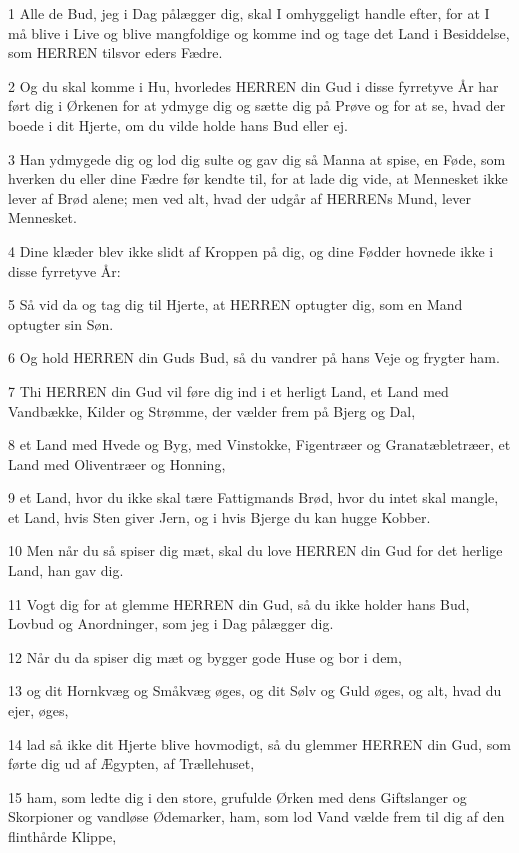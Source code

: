 \par 1 Alle de Bud, jeg i Dag pålægger dig, skal I omhyggeligt handle efter, for at I må blive i Live og blive mangfoldige og komme ind og tage det Land i Besiddelse, som HERREN tilsvor eders Fædre.
\par 2 Og du skal komme i Hu, hvorledes HERREN din Gud i disse fyrretyve År har ført dig i Ørkenen for at ydmyge dig og sætte dig på Prøve og for at se, hvad der boede i dit Hjerte, om du vilde holde hans Bud eller ej.
\par 3 Han ydmygede dig og lod dig sulte og gav dig så Manna at spise, en Føde, som hverken du eller dine Fædre før kendte til, for at lade dig vide, at Mennesket ikke lever af Brød alene; men ved alt, hvad der udgår af HERRENs Mund, lever Mennesket.
\par 4 Dine klæder blev ikke slidt af Kroppen på dig, og dine Fødder hovnede ikke i disse fyrretyve År:
\par 5 Så vid da og tag dig til Hjerte, at HERREN optugter dig, som en Mand optugter sin Søn.
\par 6 Og hold HERREN din Guds Bud, så du vandrer på hans Veje og frygter ham.
\par 7 Thi HERREN din Gud vil føre dig ind i et herligt Land, et Land med Vandbække, Kilder og Strømme, der vælder frem på Bjerg og Dal,
\par 8 et Land med Hvede og Byg, med Vinstokke, Figentræer og Granatæbletræer, et Land med Oliventræer og Honning,
\par 9 et Land, hvor du ikke skal tære Fattigmands Brød, hvor du intet skal mangle, et Land, hvis Sten giver Jern, og i hvis Bjerge du kan hugge Kobber.
\par 10 Men når du så spiser dig mæt, skal du love HERREN din Gud for det herlige Land, han gav dig.
\par 11 Vogt dig for at glemme HERREN din Gud, så du ikke holder hans Bud, Lovbud og Anordninger, som jeg i Dag pålægger dig.
\par 12 Når du da spiser dig mæt og bygger gode Huse og bor i dem,
\par 13 og dit Hornkvæg og Småkvæg øges, og dit Sølv og Guld øges, og alt, hvad du ejer, øges,
\par 14 lad så ikke dit Hjerte blive hovmodigt, så du glemmer HERREN din Gud, som førte dig ud af Ægypten, af Trællehuset,
\par 15 ham, som ledte dig i den store, grufulde Ørken med dens Giftslanger og Skorpioner og vandløse Ødemarker, ham, som lod Vand vælde frem til dig af den flinthårde Klippe,
